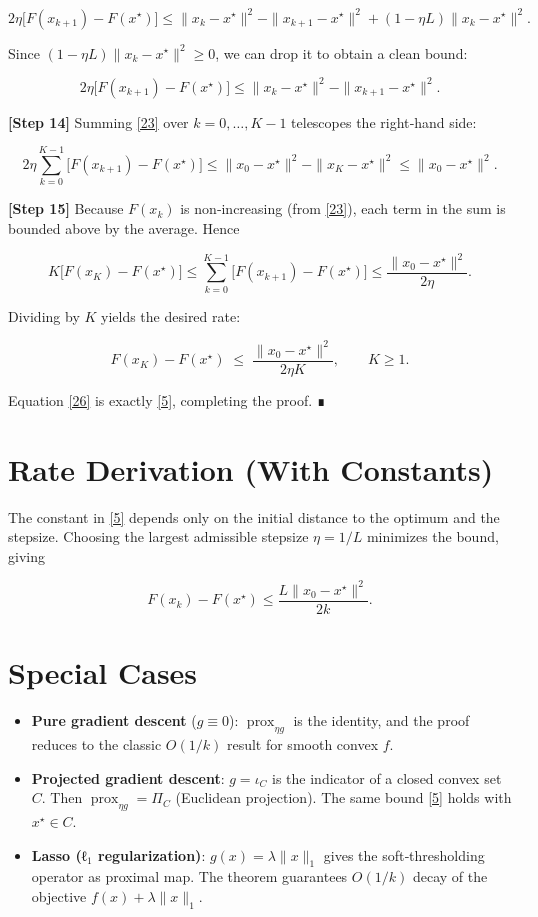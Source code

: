 \documentclass{article}
\newcommand{\prox}{\operatorname{prox}}
\begin{document}
\[
2\eta\bigl[F(x_{k+1})-F(x^{\star})\bigr]
\le \|x_{k}-x^{\star}\|^{2}-\|x_{k+1}-x^{\star}\|^{2}
+(1-\eta L)\|x_{k}-x^{\star}\|^{2}. \tag{22}
\]

Since $(1-\eta L)\|x_{k}-x^{\star}\|^{2}\ge0$, we can drop it to obtain a clean bound:

\[
2\eta\bigl[F(x_{k+1})-F(x^{\star})\bigr]
\le \|x_{k}-x^{\star}\|^{2}-\|x_{k+1}-x^{\star}\|^{2}. \tag{23}
\]

\noindent\textbf{[Step 14]} Summing \eqref{23} over $k=0,\dots, K-1$ telescopes the right‑hand side:

\[
2\eta\sum_{k=0}^{K-1}\bigl[F(x_{k+1})-F(x^{\star})\bigr]
\le \|x_{0}-x^{\star}\|^{2}-\|x_{K}-x^{\star}\|^{2}
\le \|x_{0}-x^{\star}\|^{2}. \tag{24}
\]

\noindent\textbf{[Step 15]} Because $F(x_{k})$ is non‑increasing (from \eqref{23}), each term in the sum is bounded above by the average. Hence

\[
K\bigl[F(x_{K})-F(x^{\star})\bigr]
\le \sum_{k=0}^{K-1}\bigl[F(x_{k+1})-F(x^{\star})\bigr]
\le \frac{\|x_{0}-x^{\star}\|^{2}}{2\eta}. \tag{25}
\]

Dividing by $K$ yields the desired rate:

\[
F(x_{K})-F(x^{\star})\;\le\;\frac{\|x_{0}-x^{\star}\|^{2}}{2\eta K},
\qquad K\ge1. \tag{26}
\]

Equation \eqref{26} is exactly \eqref{5}, completing the proof. ∎

\section*{Rate Derivation (With Constants)}
The constant in \eqref{5} depends only on the initial distance to the optimum and the stepsize. Choosing the largest admissible stepsize $\eta=1/L$ minimizes the bound, giving  

\[
F(x_{k})-F(x^{\star})\le \frac{L\|x_{0}-x^{\star}\|^{2}}{2k}.
\tag{27}
\]

\section*{Special Cases}
\begin{itemize}
  \item \textbf{Pure gradient descent} ($g\equiv0$): $\prox_{\eta g}$ is the identity, and the proof reduces to the classic $O(1/k)$ result for smooth convex $f$.
  \item \textbf{Projected gradient descent}: $g=\iota_{C}$ is the indicator of a closed convex set $C$. Then $\prox_{\eta g}=\Pi_{C}$ (Euclidean projection). The same bound \eqref{5} holds with $x^{\star}\in C$.
  \item \textbf{Lasso (ℓ\(_1\) regularization)}: $g(x)=\lambda\|x\|_{1}$ gives the soft‑thresholding operator as proximal map. The theorem guarantees $O(1/k)$ decay of the objective $f(x)+\lambda\|x\|_{1}$.
\end{itemize}
\end{document}
